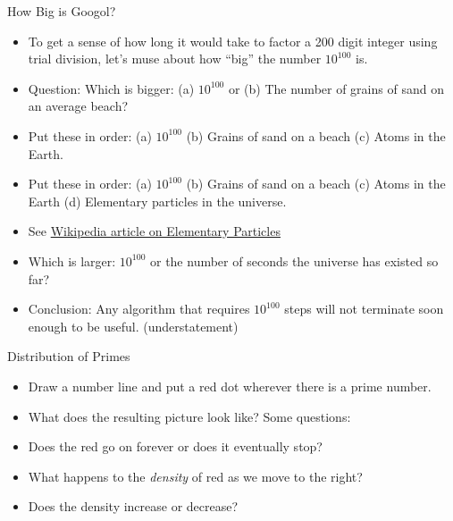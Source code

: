 \documentclass[handout]{beamer}
\begin{document}
\begin{frame}{How Big is Googol?}
\begin{itemize}
  \item To get a sense of how long it would take to factor a 200 digit integer using trial division,
  let's muse about how ``big'' the number $10^{100}$ is.
  \item Question: Which is bigger: (a) $10^{100}$ or (b) The number of grains of sand on an average beach?
  \item Put these in order: (a) $10^{100}$ (b) Grains of sand on a beach
  (c) Atoms in the Earth.
  \item Put these in order: (a) $10^{100}$ (b) Grains of sand on a beach
  (c) Atoms in the Earth (d) Elementary particles in the universe.
  \item See \href{https://en.wikipedia.org/wiki/Elementary_particle\#Cosmic_abundance_of_elementary_particles}{Wikipedia article on Elementary Particles}
  \item Which is larger: $10^{100}$ or the number of seconds the universe has existed so far?
  \item Conclusion: Any algorithm that requires $10^{100}$ steps will not terminate soon enough to be useful. (understatement)
\end{itemize}
\end{frame}

\begin{frame}{Distribution of Primes}

\begin{itemize}
  \item Draw a number line and put a red dot wherever there is a prime number.
  \item What does the resulting picture look like? Some questions:
  \item Does the red go on forever or does it eventually stop?
  \item What happens to the \emph{density} of red as we move to the right?
  \item Does the density increase or decrease?
\end{itemize}

\end{frame}
\end{document}
